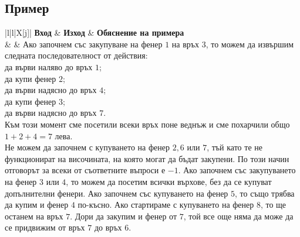 \documentclass[12pt]{article}
\begin{document}
\subsection{Пример}
\begin{table}[H]
	\begin{tblr}{|l|l|X[j]|}
		\hline
		\textbf{Вход} & \textbf{Изход} & \textbf{Обяснение на примера} \\
		\hline
		\texttt{}
		& 
		\texttt{}
		& 
		{Ако започнем със закупуване на фенер $1$ на връх $3$, то можем да извършим следната последователност от действия:\\
		\indent\tabitem да върви наляво до връх $1$;\\
		\indent\tabitem да купи фенер $2$;\\
		\indent\tabitem да върви надясно до връх $4$;\\
		\indent\tabitem да купи фенер $3$;\\
		\indent\tabitem да върви надясно до връх $7$.\\
		Към този момент сме посетили всеки връх поне веднъж и сме похарчили общо $1+2+4=7$ лева.\\
		Не можем да започнем с купуването на фенер $2, 6$ или $7$, тъй като те не функционират на височината, на която могат да бъдат закупени. По този начин отговорът за всеки от съответните въпроси е $-1$. Ако започнем със закупуването на фенер $3$ или $4$, то можем да посетим всички върхове, без да се купуват допълнителни фенери. Ако започнем със купуването на фенер $5$, то също трябва да купим и фенер $4$ по-късно. Ако стартираме с купуването на фенер $8$, то ще останем на връх $7$. Дори да закупим и фенер от $7$, той все още няма да може да се придвижим от връх $7$ до връх $6$.} \\
		\hline
	\end{tblr}
\end{table}
\FloatBarrier
	
\end{document}
